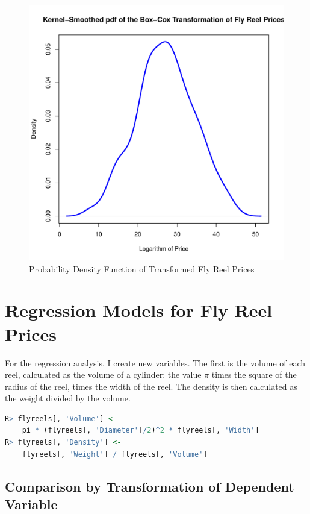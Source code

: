 \begin{figure}[h!]
  \centering
  \includegraphics[scale = 0.5, keepaspectratio=true]{../Figures/density_trans_prices}
  \caption{Probability Density Function of Transformed Fly Reel Prices} \label{fig:density_trans_prices}
\end{figure}


\pagebreak
\section{Regression Models for Fly Reel Prices}


For the regression analysis, I create new variables.
The first is the volume of each reel, 
calculated as the volume of a cylinder: 
the value $\pi$ times the square of the radius of the reel,
times the width of the reel. 
The density is then calculated as the weight 
divided by the volume. 

\begin{lstlisting}[language=R]
R> flyreels[, 'Volume'] <- 
	pi * (flyreels[, 'Diameter']/2)^2 * flyreels[, 'Width']
R> flyreels[, 'Density'] <- 
	flyreels[, 'Weight'] / flyreels[, 'Volume']
\end{lstlisting}



\subsection{Comparison by Transformation of Dependent Variable}

